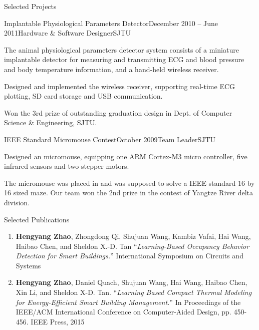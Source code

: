 \documentclass{resume} %
\begin{document}
\begin{rSection}{Selected Projects}
    \begin{rSubsection}{Implantable Physiological Parameters Detector}{December 2010 -- June 2011}{Hardware \& Software Designer}{SJTU}

    \item The animal physiological parameters detector system consists of a
        miniature implantable detector for measuring and transmitting ECG and
        blood pressure and body temperature information, and a hand-held
        wireless receiver.

    \item Designed and implemented the wireless receiver, supporting real-time
        ECG plotting, SD card storage and USB communication.

    \item Won the 3rd prize of outstanding graduation design in Dept. of Computer
        Science \& Engineering, SJTU.

    \end{rSubsection}

    \begin{rSubsection}{IEEE Standard Micromouse Contest}{October 2009}{Team Leader}{SJTU}

    \item Designed an micromouse, equipping one ARM Cortex-M3 micro controller,
        five infrared sensors and two stepper motors.

    \item The micromouse was placed in and was supposed to solve a IEEE
        standard 16 by 16 sized maze.  Our team won the 2nd prize in the
        contest of Yangtze River delta division.

    \end{rSubsection}

\end{rSection}


\begin{rSection}{Selected Publications}

\begin{enumerate}

    \item \textbf{Hengyang Zhao}, Zhongdong Qi, Shujuan Wang, Kambiz Vafai, Hai
        Wang, Haibao Chen, and Sheldon X.-D. Tan ``\textit{Learning-Based
        Occupancy Behavior Detection for Smart Buildings.}'' International
        Symposium on Circuits and Systems

    \item \textbf{Hengyang Zhao}, Daniel Quach, Shujuan Wang, Hai Wang, Haibao
        Chen, Xin Li, and Sheldon X-D. Tan. ``\textit{Learning Based Compact
        Thermal Modeling for Energy-Efficient Smart Building Management.}'' In
        Proceedings of the IEEE/ACM International Conference on Computer-Aided
        Design, pp.  450-456. IEEE Press, 2015

\end{enumerate}

\end{rSection}
\end{document}
